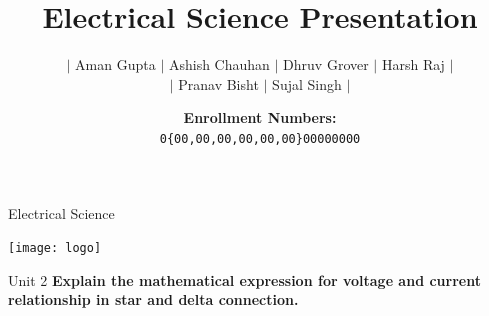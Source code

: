 \documentclass[11pt]{beamer}
\title{Electrical Science Presentation}
\author[Aman, Ashish, Dhruv...]{\(|\) Aman Gupta \(|\) Ashish Chauhan \(|\) Dhruv Grover \(|\) Harsh Raj \(|\)\\
    \(|\) Pranav Bisht \(|\) Sujal Singh \(|\)}
\date[Harsh, Pranav, Sujal]{\textbf{Enrollment Numbers:\\}\texttt{0\{00,00,00,00,00,00\}00000000}}
\begin{document}
    \begin{frame}{Electrical Science}
        \begin{center}
            \texttt{[image: logo]}
        \end{center}\vspace*{-10pt}
        \maketitle
    \end{frame}

    \begin{frame}[t]{Unit 2}
        \textbf{\large Explain the mathematical expression for voltage and current relationship in star and delta
        connection.}
    \end{frame}
\end{document}

